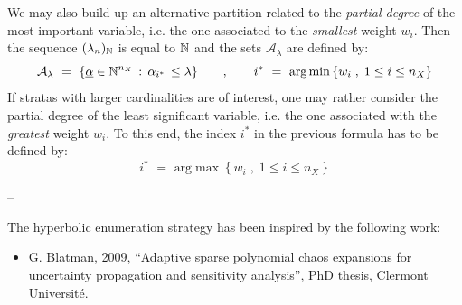 {We may also build up an alternative partition related to the \emph{partial degree} of the most important variable, i.e. the one associated to the \emph{smallest} weight $w_i$. Then the sequence $(\lambda_n)_{{\mathbb N}}$ is equal to ${\mathbb N}$ and the sets $\mathcal{A}_{\lambda}$ are defined by:
\begin{equation} 
  \mathcal{A}_{\lambda} \, \, = \, \, \{\underline{\alpha} \in \mathbb{N}^{n_X} \, : \, \alpha_{i^*} \, \leq \lambda \} \quad \quad , \quad \quad i^* \, \, = \, \, \mbox{arg} \min \left\{w_i \; , \; 1\leq i \leq n_X \right\} 
\end{equation}
If stratas with larger cardinalities are of interest, one may rather consider the partial degree of the least significant variable, i.e. the one associated with the \emph{greatest} weight $w_i$. To this end, the index $i^*$ in the previous formula has to be defined by:
\begin{equation} 
   i^* \, \, = \, \, \mbox{arg} \max \left\{w_i \; , \; 1\leq i \leq n_X \right\} 
\end{equation}




}

{
  --
}

{
The hyperbolic enumeration strategy has been inspired by the following work:
\begin{itemize}
  \item G. Blatman, 2009, ``Adaptive sparse polynomial chaos expansions for uncertainty propagation and sensitivity analysis'', PhD thesis, Clermont Universit\'e.
  \end{itemize}
}


